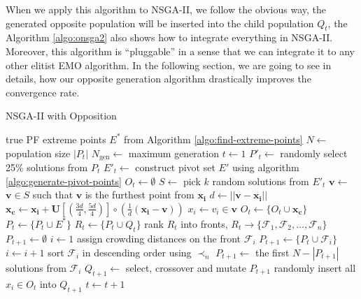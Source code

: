 \documentclass[journal]{IEEEtran}
\let\MYoriglatexcaption\caption
\renewcommand{\caption}[2][\relax]{\MYoriglatexcaption[#2]{#2}}
\begin{document}
When we apply this algorithm to NSGA-II, we follow the obvious way, the generated opposite population will be inserted into the child population \(Q_t\), the Algorithm \ref{algo:onsga2} also shows how to integrate everything in NSGA-II. Moreover, this algorithm is ``pluggable'' in a sense that we can integrate it to any other elitist EMO algorithm. In the following section, we are going to see in details, how our opposite generation algorithm drastically improves the convergence rate.
%
\begin{algorithm}[tp]
\caption{NSGA-II with Opposition}
\label{algo:onsga2}
\begin{algorithmic}[1]
	\REQUIRE true PF extreme points $E^{\ast}$ from Algorithm \ref{algo:find-extreme-points}
	\STATE $N \leftarrow$ population size $|P_t|$
	\STATE $N_{\text{gen}} \leftarrow $ maximum generation
	\STATE $t \leftarrow 1$
		\STATE $P'_t \leftarrow$ randomly select 25\% solutions from $P_t$
		\STATE $E'_t \leftarrow$ construct pivot set $E'$ using algorithm \ref{algo:generate-pivot-points}
		\STATE $O_t \leftarrow \emptyset$
			\STATE $S \leftarrow$ pick $k$ random solutions from $E'_t$
			\STATE $\mathbf{v} \leftarrow$ $\mathbf{v} \in S$ such that $\mathbf{v}$ is the furthest point from $\mathbf{x_i}$
			\STATE $d \leftarrow ||\mathbf{v} - \mathbf{x_i}||$
			\STATE $\mathbf{x_c} \leftarrow \mathbf{x_i} + \mathbf{U}[(\frac{3d}{4}, \frac{5d}{4})] \circ (\frac{1}{d}(\mathbf{x_i} - \mathbf{v}))$
					\STATE $x_i \leftarrow v_i \in \mathbf{v}$
				\ENDIF
			\ENDFOR
			\STATE $O_t \leftarrow \{O_t \cup \mathbf{x_c}\}$
		\ENDFOR
		\STATE $P_t \leftarrow \{P_t \cup  E^\ast\}$
		\STATE $R_t \leftarrow \{P_t \cup Q_t\}$
		\STATE rank $R_t$ into fronts, $R_t \rightarrow \{\mathcal{F}_1, \mathcal{F}_2, \ldots, \mathcal{F}_n\}$
		\STATE $P_{t+1} \leftarrow \emptyset$
		\STATE $i \leftarrow 1$
			\STATE assign crowding distances on the front $\mathcal{F}_i$
			\STATE $P_{t+1} \leftarrow \{P_t \cup \mathcal{F}_i\}$
			\STATE $i \leftarrow i + 1$
		\ENDWHILE
		\STATE sort $\mathcal{F}_i$ in descending order using $\prec_n$
		\STATE $P_{t+1} \leftarrow$ the first $N - |P_{t+1}|$ solutions from $\mathcal{F}_i$
		\STATE $Q_{t+1} \leftarrow$ select, crossover and mutate $P_{t+1}$
		\STATE randomly insert all $x_i \in O_t$ into $Q_{t+1}$
		\STATE $t \leftarrow t + 1$
	\ENDWHILE
\end{algorithmic}
\end{algorithm}
\end{document}
